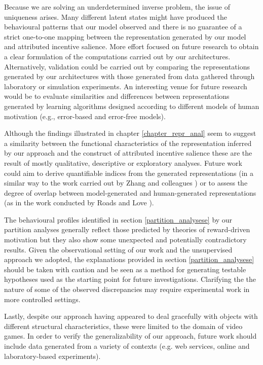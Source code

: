Because we are solving an underdetermined inverse problem, the issue of uniqueness arises. Many different latent states might have produced the behavioural patterns that our model observed and there is no guarantee of a strict one-to-one mapping between the representation generated by our model and attributed incentive salience.  More effort focused on future research to obtain a clear formulation of the computations carried out by our architectures. Alternatively, validation could be carried out by comparing the representations generated by our architectures with those generated from data gathered through laboratory or simulation experiments. An interesting venue for future research would be to evaluate similarities and differences between representations generated by learning algorithms designed according to different models of human motivation (e.g., error-based \cite{schultz1997neural} and error-free \cite{friston2012active} models).

Although the findings illustrated in chapter \ref{chapter_repr_anal} seem to suggest a similarity between the functional characteristics of the representation inferred by our approach and the construct of attributed incentive salience these are the result of mostly qualitative, descriptive or exploratory analyses. Future work could aim to derive quantifiable indices from the generated representations (in a similar way to the work carried out by Zhang and colleagues \cite{zhang2009neural}) or to assess the degree of overlap between model-generated and human-generated representations (as in the work conducted by Roads and Love \cite{roads2021enriching}).

The behavioural profiles identified in section \ref{partition_analysese} by our partition analyses generally reflect those predicted by theories of reward-driven motivation \cite{thorndike1927law,skinner1965science,berridge2004motivation} but they also show some unexpected and potentially contradictory results. Given the observational setting of our work and the unsupervised approach we adopted, the explanations provided in section \ref{partition_analysese} should be taken with caution and be seen as a method for generating testable hypotheses used as the starting point for future investigations. Clarifying the the nature of some of the observed discrepancies may require experimental work in more controlled settings. 

Lastly, despite our approach having appeared to deal gracefully with objects with different structural characteristics, these were limited to the domain of video games. In order to verify the generalizability of our approach, future work should include data generated from a variety of contexts (e.g. web services, online and laboratory-based experiments).  

